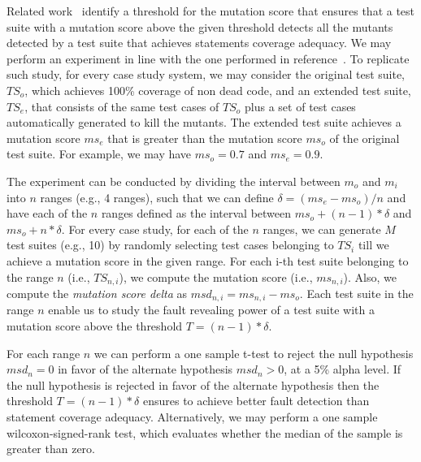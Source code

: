 Related work~\cite{CChekam:17} identify a threshold for the mutation score that ensures that a test suite with a mutation score above the given threshold detects all the mutants detected by a test suite that achieves statements coverage adequacy. 
We may perform an experiment in line with the one performed in reference~\cite{CChekam:17}.
To replicate such study, for every case study system, we may consider the original test suite, $\mathit{TS}_o$, which achieves 100\% coverage of non dead code, and an extended test suite, $\mathit{TS}_e$, that consists of the same test cases of $\mathit{TS}_o$ plus a set of test cases automatically generated to kill the mutants. The extended test suite achieves a mutation score $ms_e$ that is greater than the mutation score $\mathit{ms}_o$ of the original test suite. For example, we may have $\mathit{ms}_o=0.7$ and $\mathit{ms}_e=0.9$.

The experiment can be conducted by dividing the interval between $m_o$ and $m_i$ into $n$ ranges (e.g., 4 ranges), such that we can define $\delta = (\mathit{ms}_e - \mathit{ms}_o)/n$ and have each of the $n$ ranges defined as the interval between $\mathit{ms}_o+(n-1)*\delta$ and $\mathit{ms}_o+n*\delta$.
For every case study, for each of the $n$ ranges, we can generate $M$ test suites  (e.g., 10) by randomly selecting test cases belonging to $\mathit{TS}_i$ till we achieve a mutation score in the given range.
For each i-th test suite belonging to the range $n$ (i.e., $\mathit{TS}_{n,i}$), we compute the mutation score (i.e., $ms_{n,i}$).
Also, we compute the \emph{mutation score delta} as $msd_{n,i}=ms_{n,i}-ms_o$. Each test suite in the range $n$ enable us to study the fault revealing power of a test suite with a mutation score above the threshold $T=(n-1)*\delta$.

For each range $n$ we can perform a one sample t-test to reject the null hypothesis $msd_{n} = 0$ in favor of the alternate hypothesis $msd_{n} > 0$, at a 5\% alpha level.
If the null hypothesis is rejected in favor of the alternate hypothesis then the threshold $T=(n-1)*\delta$ ensures to achieve better fault detection than statement coverage adequacy.
Alternatively, we may perform a one sample wilcoxon-signed-rank test, which evaluates whether the median of the sample is greater than zero.


